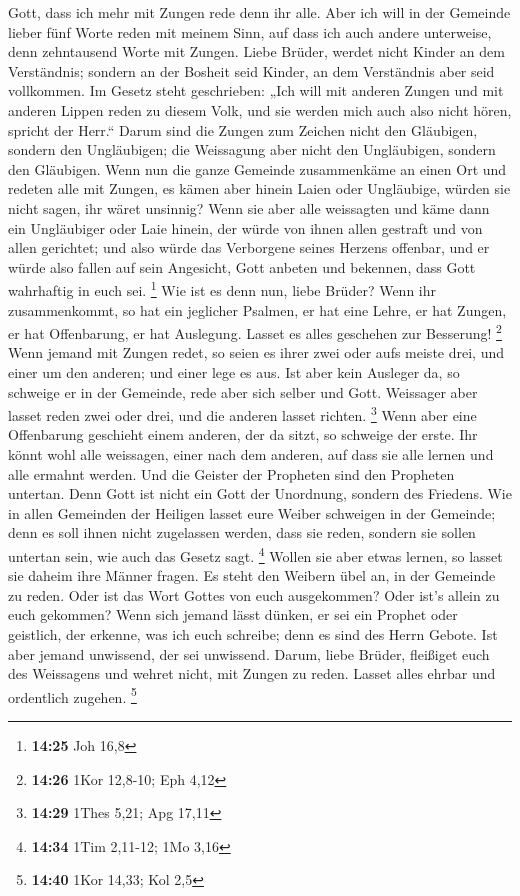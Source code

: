 Gott, dass ich mehr mit Zungen rede denn ihr alle.  Aber
ich will in der Gemeinde lieber fünf Worte reden mit meinem Sinn, auf
dass ich auch andere unterweise, denn zehntausend Worte mit Zungen.
 Liebe Brüder, werdet nicht Kinder an dem Verständnis;
sondern an der Bosheit seid Kinder, an dem Verständnis aber seid
vollkommen.  Im Gesetz steht geschrieben: „Ich will mit
anderen Zungen und mit anderen Lippen reden zu diesem Volk, und sie
werden mich auch also nicht hören, spricht der Herr.`` 
Darum sind die Zungen zum Zeichen nicht den Gläubigen, sondern den
Ungläubigen; die Weissagung aber nicht den Ungläubigen, sondern den
Gläubigen.  Wenn nun die ganze Gemeinde zusammenkäme an
einen Ort und redeten alle mit Zungen, es kämen aber hinein Laien oder
Ungläubige, würden sie nicht sagen, ihr wäret unsinnig? 
Wenn sie aber alle weissagten und käme dann ein Ungläubiger oder Laie
hinein, der würde von ihnen allen gestraft und von allen gerichtet;
 und also würde das Verborgene seines Herzens offenbar,
und er würde also fallen auf sein Angesicht, Gott anbeten und bekennen,
dass Gott wahrhaftig in euch sei. \footnote{\textbf{14:25} Joh 16,8}
 Wie ist es denn nun, liebe Brüder? Wenn ihr
zusammenkommt, so hat ein jeglicher Psalmen, er hat eine Lehre, er hat
Zungen, er hat Offenbarung, er hat Auslegung. Lasset es alles geschehen
zur Besserung! \footnote{\textbf{14:26} 1Kor 12,8-10; Eph 4,12}
 Wenn jemand mit Zungen redet, so seien es ihrer zwei
oder aufs meiste drei, und einer um den anderen; und einer lege es aus.
 Ist aber kein Ausleger da, so schweige er in der
Gemeinde, rede aber sich selber und Gott.  Weissager aber
lasset reden zwei oder drei, und die anderen lasset richten. \footnote{\textbf{14:29}
  1Thes 5,21; Apg 17,11}  Wenn aber eine Offenbarung
geschieht einem anderen, der da sitzt, so schweige der erste.
 Ihr könnt wohl alle weissagen, einer nach dem anderen,
auf dass sie alle lernen und alle ermahnt werden.  Und
die Geister der Propheten sind den Propheten untertan. 
Denn Gott ist nicht ein Gott der Unordnung, sondern des Friedens.
 Wie in allen Gemeinden der Heiligen lasset eure Weiber
schweigen in der Gemeinde; denn es soll ihnen nicht zugelassen werden,
dass sie reden, sondern sie sollen untertan sein, wie auch das Gesetz
sagt. \footnote{\textbf{14:34} 1Tim 2,11-12; 1Mo 3,16} 
Wollen sie aber etwas lernen, so lasset sie daheim ihre Männer fragen.
Es steht den Weibern übel an, in der Gemeinde zu reden. 
Oder ist das Wort Gottes von euch ausgekommen? Oder ist's allein zu euch
gekommen?  Wenn sich jemand lässt dünken, er sei ein
Prophet oder geistlich, der erkenne, was ich euch schreibe; denn es sind
des Herrn Gebote.  Ist aber jemand unwissend, der sei
unwissend.  Darum, liebe Brüder, fleißiget euch des
Weissagens und wehret nicht, mit Zungen zu reden.  Lasset
alles ehrbar und ordentlich zugehen. \footnote{\textbf{14:40} 1Kor
  14,33; Kol 2,5}


